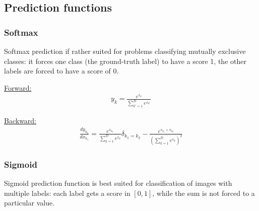 \subsection{Prediction functions}



\subsubsection{Softmax}
Softmax prediction if rather suited for problems classifying mutually exclusive classes: it forces one class (the ground-truth label) to have a score 
1, the other labels are forced to have a score of 0. 

  \begin{center}
  \end{center}

\noindent
\underline{Forward:} 
\begin{align}
 y_k = \frac{e^{x_k}}{\sum_{k'=1}^D e^{x_{k'}}} \nonumber
\end{align}

\noindent
\underline{Backward:}
\begin{align}
 \frac{dy_{k_2}}{dx_{k_1}} = \frac{e^{x_{k_2}}}{\sum_{k=1}^{D}e^{x_k}} \delta_{k_1=k_2} - \frac{e^{x_{k_1}+x_{k_2}}}{(\sum_{k=1}^{D}e^{x_k})^2} 
\nonumber
\end{align}





\subsubsection{Sigmoid}
Sigmoid prediction function is best suited for classification of images with multiple labels: each label gets a score in $[0, 1]$, while the sum is 
not forced to a particular value.

